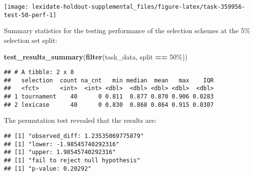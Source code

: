 \documentclass[
]{book}
\newenvironment{Shaded}{\begin{snugshade}}{\end{snugshade}}
\newcommand{\AttributeTok}[1]{\textcolor[rgb]{0.13,0.29,0.53}{#1}}
\newcommand{\DecValTok}[1]{\textcolor[rgb]{0.00,0.00,0.81}{#1}}
\newcommand{\FunctionTok}[1]{\textcolor[rgb]{0.13,0.29,0.53}{\textbf{#1}}}
\newcommand{\NormalTok}[1]{#1}
\newcommand{\OtherTok}[1]{\textcolor[rgb]{0.56,0.35,0.01}{#1}}
\newcommand{\SpecialCharTok}[1]{\textcolor[rgb]{0.81,0.36,0.00}{\textbf{#1}}}
\newcommand{\StringTok}[1]{\textcolor[rgb]{0.31,0.60,0.02}{#1}}
\begin{document}
\texttt{[image: lexidate-holdout-supplemental\_files/figure-latex/task-359956-test-50-perf-1]}

Summary statistics for the testing performance of the selection schemes at the 5\% selection set split:

\begin{Shaded}
\begin{Highlighting}[]
\FunctionTok{test\_results\_summary}\NormalTok{(}\FunctionTok{filter}\NormalTok{(task\_data, split }\SpecialCharTok{==} \StringTok{\textquotesingle{}50\%\textquotesingle{}}\NormalTok{))}
\end{Highlighting}
\end{Shaded}

\begin{verbatim}
## # A tibble: 2 x 8
##   selection  count na_cnt   min median  mean   max    IQR
##   <fct>      <int>  <int> <dbl>  <dbl> <dbl> <dbl>  <dbl>
## 1 tournament    40      0 0.811  0.877 0.870 0.906 0.0283
## 2 lexicase      40      0 0.830  0.868 0.864 0.915 0.0307
\end{verbatim}

The permutation test revealed that the results are:

\begin{Shaded}
\end{Shaded}

\begin{verbatim}
## [1] "observed_diff: 1.23535069775879"
## [1] "lower: -1.98545740292316"
## [1] "upper: 1.98545740292316"
## [1] "fail to reject null hypothesis"
## [1] "p-value: 0.20292"
\end{verbatim}
\end{document}
